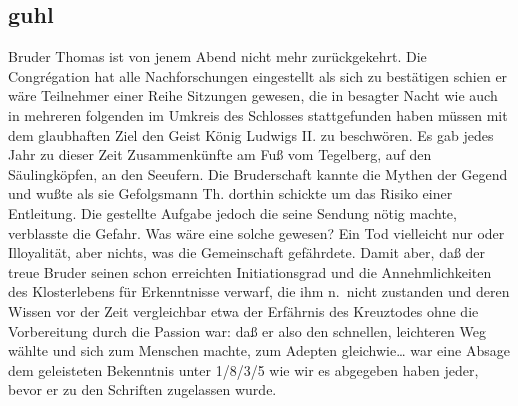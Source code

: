 \documentclass[
]{article}
\author{}
\date{\vspace{-2.5em}}
\begin{document}
\subsection{guhl}\label{guhl}

Bruder Thomas ist von jenem Abend nicht mehr zurückgekehrt. Die
Congrégation hat alle Nachforschungen eingestellt als sich zu bestätigen
schien er wäre Teilnehmer einer Reihe Sitzungen gewesen, die in besagter
Nacht wie auch in mehreren folgenden im Umkreis des Schlosses
stattgefunden haben müssen mit dem glaubhaften Ziel den Geist König
Ludwigs II. zu beschwören. Es gab jedes Jahr zu dieser Zeit
Zusammenkünfte am Fuß vom Tegelberg, auf den Säulingköpfen, an den
Seeufern. Die Bruderschaft kannte die Mythen der Gegend und wußte als
sie Gefolgsmann Th. dorthin schickte um das Risiko einer Entleitung. Die
gestellte Aufgabe jedoch die seine Sendung nötig machte, verblasste die
Gefahr. Was wäre eine solche gewesen? Ein Tod vielleicht nur oder
Illoyalität, aber nichts, was die Gemeinschaft gefährdete. Damit aber,
daß der treue Bruder seinen schon erreichten Initiationsgrad und die
Annehmlichkeiten des Klosterlebens für Erkenntnisse verwarf, die ihm
n.~nicht zustanden und deren Wissen vor der Zeit vergleichbar etwa der
Erfährnis des Kreuztodes ohne die Vorbereitung durch die Passion war:
daß er also den schnellen, leichteren Weg wählte und sich zum Menschen
machte, zum Adepten gleichwie\ldots{} war eine Absage dem geleisteten
Bekenntnis unter 1/8/3/5 wie wir es abgegeben haben jeder, bevor er zu
den Schriften zugelassen wurde.
\end{document}
